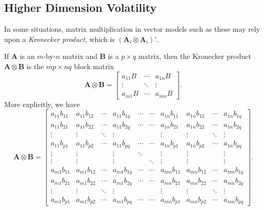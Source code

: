 \subsection{Higher Dimension Volatility}

In some situations, matrix multiplication in vector models such as these may rely upon a \emph{Kronecker product}, which is $(\mathbf{A}_i \otimes \mathbf{A}_i)'$.

If $\mathbf{A}$ is an $m$-by-$n$ matrix and $\mathbf{B}$ is a $p \times q$ matrix, then the Kronecker product $\mathbf{A}\otimes\mathbf{B}$ is the $mp \times nq$ block matrix
\[
\mathbf{A}\otimes\mathbf{B} = \begin{bmatrix} a_{11} B & \cdots & a_{1n}B \\ \vdots & \ddots & \vdots \\ a_{m1} B & \cdots & a_{mn} B \end{bmatrix}. 
\]
More explicitly, we have
\[
\mathbf{A}\otimes\mathbf{B} = \begin{bmatrix}    a_{11} b_{11} & a_{11} b_{12} & \cdots & a_{11} b_{1q} &                     \cdots & \cdots & a_{1n} b_{11} & a_{1n} b_{12} & \cdots & a_{1n} b_{1q} \\    a_{11} b_{21} & a_{11} b_{22} & \cdots & a_{11} b_{2q} &                     \cdots & \cdots & a_{1n} b_{21} & a_{1n} b_{22} & \cdots & a_{1n} b_{2q} \\    \vdots & \vdots & \ddots & \vdots & & & \vdots & \vdots & \ddots & \vdots \\    a_{11} b_{p1} & a_{11} b_{p2} & \cdots & a_{11} b_{pq} &                     \cdots & \cdots & a_{1n} b_{p1} & a_{1n} b_{p2} & \cdots & a_{1n} b_{pq} \\    \vdots & \vdots & & \vdots & \ddots & & \vdots & \vdots & & \vdots \\    \vdots & \vdots & & \vdots & & \ddots & \vdots & \vdots & & \vdots \\    a_{m1} b_{11} & a_{m1} b_{12} & \cdots & a_{m1} b_{1q} &                     \cdots & \cdots & a_{mn} b_{11} & a_{mn} b_{12} & \cdots & a_{mn} b_{1q} \\    a_{m1} b_{21} & a_{m1} b_{22} & \cdots & a_{m1} b_{2q} &                     \cdots & \cdots & a_{mn} b_{21} & a_{mn} b_{22} & \cdots & a_{mn} b_{2q} \\    \vdots & \vdots & \ddots & \vdots & & & \vdots & \vdots & \ddots & \vdots \\    a_{m1} b_{p1} & a_{m1} b_{p2} & \cdots & a_{m1} b_{pq} &                     \cdots & \cdots & a_{mn} b_{p1} & a_{mn} b_{p2} & \cdots & a_{mn} b_{pq}  \end{bmatrix}. 
\]

